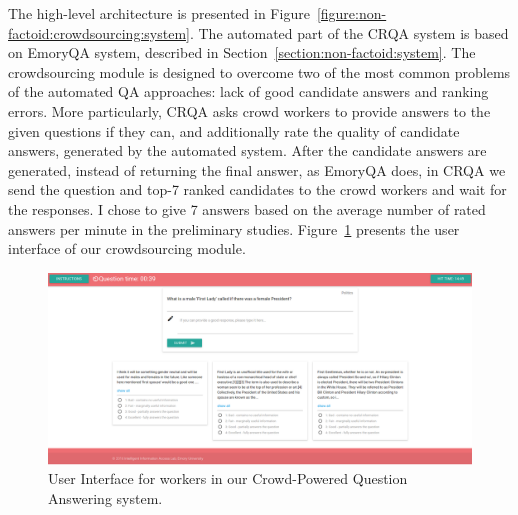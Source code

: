 The high-level architecture is presented in Figure~\ref{figure:non-factoid:crowdsourcing:system}.
The automated part of the CRQA system is based on EmoryQA system, described in Section~\ref{section:non-factoid:system}.
The crowdsourcing module is designed to overcome two of the most common problems of the automated QA approaches: lack of good candidate answers and ranking errors.
More particularly, CRQA asks crowd workers to provide answers to the given questions if they can, and additionally rate the quality of candidate answers, generated by the automated system.
After the candidate answers are generated, instead of returning the final answer, as EmoryQA does, in CRQA we send the question and top-7 ranked candidates to the crowd workers and wait for the responses.
I chose to give 7 answers based on the average number of rated answers per minute in the preliminary studies.
Figure~\ref{figure:non-factoid:crowdsourcing:crowd_ui} presents the user interface of our crowdsourcing module.

\begin{figure}
    \centering
    \includegraphics[width=\textwidth]{img/crqa_crowd_ui}
    \caption{User Interface for workers in our Crowd-Powered Question Answering system.}
    \label{figure:non-factoid:crowdsourcing:crowd_ui}
\end{figure}

